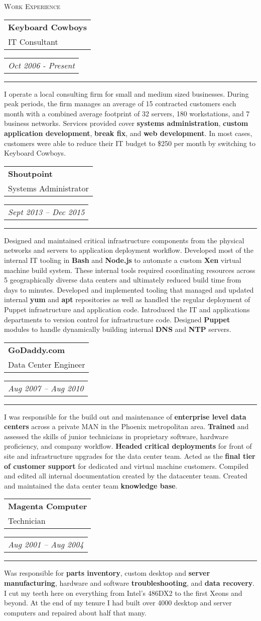 \documentclass{article}
\makeatletter
\newcommand{\split}[3]{
\noindent\begin{tabular}[t]{@{}l} 
    \textbf{#1} \\ #2
\end{tabular}
\hfill
\begin{tabular}[t]{l@{}}
    \\
    \textit{#3}
\end{tabular}
\noindent\rule{\columnwidth}{0.5pt}
}
\newcommand{\sub}[1]{
    {\raggedleft
        \large{\textsc{\color{OliveGreen}#1}}\par
    }
}
\makeatother
\begin{document}
\begin{multicols}{2}

\sub{Work Experience}

\split{Keyboard Cowboys}{IT Consultant}{Oct 2006 - Present}
I operate a local consulting firm for small and medium sized businesses. During peak periods, the firm manages an average of 15 contracted customers each month with a combined average footprint of 32 servers, 180 workstations, and 7 business networks. Services provided cover \textbf{systems administration}, \textbf{custom application development}, \textbf{break fix}, and \textbf{web development}. In most cases, customers were able to reduce their IT budget to \$250 per month by switching to Keyboard Cowboys.

\split{Shoutpoint}{Systems Administrator}{Sept 2013 -- Dec 2015}
Designed and maintained critical infrastructure components from the physical networks and servers to application deployment workflow. Developed most of the internal IT tooling in \textbf{Bash} and \textbf{Node.js} to automate a custom \textbf{Xen} virtual machine build system. These internal tools required coordinating resources across 5 geographically diverse data centers and ultimately reduced build time from days to minutes. Developed and implemented tooling that managed and updated internal \textbf{yum} and \textbf{apt} repositories as well as handled the regular deployment of Puppet infrastructure and application code. Introduced the IT and applications departments to version control for infrastructure code. Designed \textbf{Puppet} modules to handle dynamically building internal \textbf{DNS} and \textbf{NTP} servers.

\split{GoDaddy.com}{Data Center Engineer}{Aug 2007 -- Aug 2010}
I was responsible for the build out and maintenance of \textbf{enterprise level data centers} across a private MAN in the Phoenix metropolitan area. \textbf{Trained} and assessed the skills of junior technicians in proprietary software, hardware proficiency, and company workflow. \textbf{Headed critical deployments} for front of site and infrastructure upgrades for the data center team. Acted as the \textbf{final tier of customer support} for dedicated and virtual machine customers. Compiled and edited all internal documentation created by the datacenter team. Created and maintained the data center team \textbf{knowledge base}.

\split{Magenta Computer}{Technician}{Aug 2001 -- Aug 2004}
Was responsible for \textbf{parts inventory}, custom desktop and \textbf{server manufacturing}, hardware and software \textbf{troubleshooting}, and \textbf{data recovery}. I cut my teeth here on everything from Intel's 486DX2 to the first Xeons and beyond. At the end of my tenure I had built over 4000 desktop and server computers and repaired about half that many.


\end{multicols}
\end{document}
